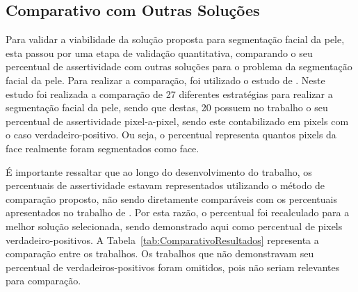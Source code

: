 \documentclass[12pt,oneside,a4paper,english,french,spanish,brazil,]{abntex2}
\begin{document}
\subsection{Comparativo com Outras Soluções}

Para validar a viabilidade da solução proposta para segmentação facial da pele, esta passou por uma etapa de validação quantitativa, comparando o seu percentual de assertividade com outras soluções para o problema da segmentação facial da pele. Para realizar a comparação, foi utilizado o estudo de \citet{kakumanu:2007}. Neste estudo foi realizada a comparação de 27 diferentes estratégias para realizar a segmentação facial da pele, sendo que destas, 20 possuem no trabalho o seu percentual de assertividade pixel-a-pixel, sendo este contabilizado em pixels com o caso verdadeiro-positivo. Ou seja, o percentual representa quantos pixels da face realmente foram segmentados como face.

É importante ressaltar que ao longo do desenvolvimento do trabalho, os percentuais de assertividade estavam representados utilizando o método de comparação proposto, não sendo diretamente comparáveis com os percentuais apresentados no trabalho de \citet{kakumanu:2007}. Por esta razão, o percentual foi recalculado para a melhor solução selecionada, sendo demonstrado aqui como percentual de pixels verdadeiro-positivos. A Tabela~\ref{tab:ComparativoResultados} representa a comparação entre os trabalhos. Os trabalhos que não demonstravam seu percentual de verdadeiros-positivos foram omitidos, pois não seriam relevantes para comparação.
\end{document}
